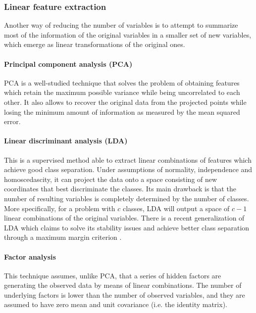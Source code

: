 \documentclass[
	fontsize=11pt, %
	twoside=false, %
	open=any, %
	secnumdepth=1, %
]{kaobook}
\newcommand{\change}[1]{{\color{blue}#1}}
\renewcommand{\change}[1]{#1}
\begin{document}
\subsubsection{Linear feature extraction}

Another way of reducing the number of variables is to attempt to summarize most of the information of the original variables in a smaller set of new variables, which emerge as linear transformations of the original ones.

\paragraph*{Principal component analysis (PCA) \cite{PCA,PCABook}} PCA  is a well-studied technique that solves the problem of obtaining features which retain the maximum possible variance while being uncorrelated to each other. It also allows to recover the original data from the projected points while losing the minimum amount of information as measured by the mean squared error. %

\paragraph*{Linear discriminant analysis (LDA) \cite{LDA}} This is a supervised method able to extract linear combinations of features which achieve good class separation. Under assumptions of normality, independence and homoscedascity, it can project the data onto a space consisting of new coordinates that best discriminate the classes. \change{Its} main drawback is that the number of resulting variables is completely determined by the number of classes. More specifically, for a problem with $c$ classes, LDA will output a space of $c-1$ linear combinations of the original variables. There is a recent generalization of LDA which claims to solve its stability issues and achieve better class separation through a maximum margin criterion \cite{li2006efficient}.

\paragraph*{Factor analysis \cite{PCAandFA}} This technique assumes, unlike PCA, that a series of hidden factors are generating the observed data by means of linear combinations. The number of underlying factors is lower than the number of observed variables, and they are assumed to have zero mean and unit covariance (i.e. the identity matrix). %
\end{document}
